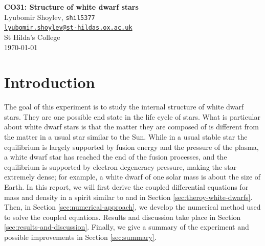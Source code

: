 \documentclass[]{article}
\begin{document}


\begin{center}
	\Large{\textbf{CO31: Structure of white dwarf stars}\\
	\vspace{1em}
	\large{Lyubomir Shoylev, \texttt{shil5377}}\\ \href{mailto:me@example.com}{\texttt{lyubomir.shoylev@st-hildas.ox.ac.uk}}}\\
	\large{St Hilda's College}\\
	\today
\end{center}

\begin{abstract}
	In an experiment, we attempt to study the structure of white dwarf stars. We give a short derivation of the differential equations describing a white dwarf in equilibrium under some assumptions about the matter. Then we introduce the computational approach of our solution and decide on parameters for the calculation. We present the dependence of radius and mass of white dwarfs on central density, as well as the relationship between them, which gives rise to the \emph{Chandrasekhar mass limit}. We discuss some of its implications, after which we present a summary of the experiment and comment on further improvements.
\end{abstract}

\section{Introduction}
	The goal of this experiment is to study the internal structure of white dwarf stars. They are one possible end state in the life cycle of stars. What is particular about white dwarf stars is that the matter they are composed of is different from the matter in a usual star similar to the Sun. While in a usual stable star the equilibrium is largely supported by fusion energy and the pressure of the plasma, a white dwarf star has reached the end of the fusion processes, and the equilibrium is supported by electron degeneracy pressure, making the star extremely dense; for example, a white dwarf of one solar mass is about the size of Earth. In this report, we will first derive the coupled differential equations for mass and density in a spirit similar to \cite{OxfPhys2020} and \cite{Chandrasekhar1984} in Section \ref{sec:theroy-white-dwarfs}. Then, in Section \ref{sec:numerical-approach}, we develop the numerical method used to solve the coupled equations. Results and discussion take place in Section \ref{sec:results-and-discussion}. Finally, we give a summary of the experiment and possible improvements in Section \ref{sec:summary}.
\end{document}
